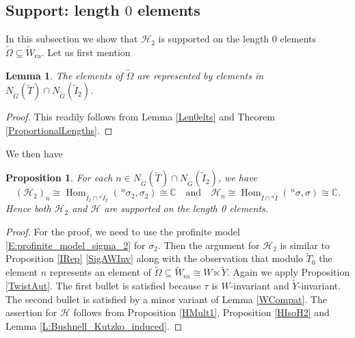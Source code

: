 \documentclass[10pt, letterpaper]{amsart}
\theoremstyle{plain}
\newtheorem{Prop}[equation]{Proposition}
\newtheorem{Lem}[equation]{Lemma}
\theoremstyle{definition}
\numberwithin{equation}{section}
\newcommand{\C}{\mathbb{C}}
\newcommand{\Gt}{\widetilde{G}}
\newcommand{\It}{\widetilde{I}}
\newcommand{\Tt}{\widetilde{T}}
\newcommand{\Yt}{\widetilde{Y}}
\newcommand{\Wt}{\widetilde{W}}
\newcommand{\Omegat}{\widetilde{\Omega}}
\newcommand{\Hom}{\operatorname{Hom}}
\newcommand{\ea}{\mathrm{ea}}
\newcommand{\Hcal}{\mathcal{H}}
\newcommand{\qand}{{\quad\text{and}\quad}}
\begin{document}

\subsection{Support: length $0$ elements}\label{SuppLen0}


In this subsection we show that $\Hcal_{2}$ is supported on the length $0$ elements $\Omegat\subseteq \Wt_{\ea}$. Let us first mention
\begin{Lem}\label{L:lenght_0_element_representative}
    The elements of $\Omegat$ are represented by elements in $N_{\Gt}(\Tt)\cap N_{\Gt}(\It_2)$.
\end{Lem}
\begin{proof}
This readily follows from  Lemma \ref{Len0elts} and Theorem \ref{ProportionalLengths}.
\end{proof}

We then have

\begin{Prop}\label{Len0Supp}
	For each $n\in N_{\Gt}(\Tt)\cap N_{\Gt}(\It_2)$, we have
	\begin{equation*}
		(\Hcal_{2})_{n}\cong\Hom_{\It_2\cap{^{n}\It_{2}}}(\,^{n}\sigma_{2},\sigma_{2})\cong \mathbb{C}\qand \Hcal_n\cong\Hom_{\It\cap{^n\It}}(\,^n\sigma, \sigma)\cong\C.
	\end{equation*}
    Hence both $\Hcal_2$ and $\Hcal$ are supported on the length 0 elements.
\end{Prop}

\begin{proof}
For the proof, we need to use the profinite model \eqref{E:profinite_model_sigma_2} for $\sigma_2$. Then the argument for $\Hcal_2$ is similar to Proposition \ref{IRep} \eqref{SigAWInv} along with the observation that modulo $\Tt_{0}$ the element $n$ represents an element of $\Omegat\subseteq \widetilde{W}_{\ea}\cong W\ltimes \Yt$. Again we apply Proposition \ref{TwistAut}. The first bullet is satisfied because $\tau$ is $W$-invariant and $\widetilde{Y}$-invariant. The second bullet is satisfied by a minor variant of Lemma \ref{WCompat}. The assertion for $\Hcal$ follows from Proposition \ref{HMult1}, Proposition \ref{HIsoH2} and Lemma \ref{L:Bushnell_Kutzko_induced}.
\end{proof}

\end{document}
